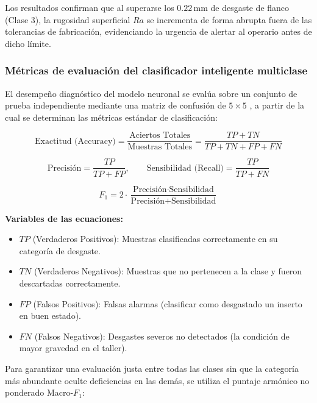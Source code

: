 Los resultados confirman que al superarse los $0.22\,\text{mm}$ de desgaste de flanco (Clase 3), la rugosidad superficial $Ra$ se incrementa de forma abrupta fuera de las tolerancias de fabricación, evidenciando la urgencia de alertar al operario antes de dicho límite.

\subsubsection{Métricas de evaluación del clasificador inteligente multiclase}

El desempeño diagnóstico del modelo neuronal se evalúa sobre un conjunto de prueba independiente mediante una matriz de confusión de $5 \times 5$ \citep{huang2026}, a partir de la cual se determinan las métricas estándar de clasificación:

\begin{equation}
\text{Exactitud (Accuracy)} = \frac{\text{Aciertos Totales}}{\text{Muestras Totales}} = \frac{TP + TN}{TP + TN + FP + FN}
\label{eq:exactitud}
\end{equation}

\begin{equation}
\text{Precisión} = \frac{TP}{TP + FP}, \qquad \text{Sensibilidad (Recall)} = \frac{TP}{TP + FN}
\label{eq:precision_recall}
\end{equation}

\begin{equation}
F_1 = 2 \cdot \frac{\text{Precisión} \cdot \text{Sensibilidad}}{\text{Precisión} + \text{Sensibilidad}}
\label{eq:f1_score}
\end{equation}

\noindent\textbf{Variables de las ecuaciones:}
\begin{itemize}
    \item $TP$ (Verdaderos Positivos): Muestras clasificadas correctamente en su categoría de desgaste.
    \item $TN$ (Verdaderos Negativos): Muestras que no pertenecen a la clase y fueron descartadas correctamente.
    \item $FP$ (Falsos Positivos): Falsas alarmas (clasificar como desgastado un inserto en buen estado).
    \item $FN$ (Falsos Negativos): Desgastes severos no detectados (la condición de mayor gravedad en el taller).
\end{itemize}

Para garantizar una evaluación justa entre todas las clases sin que la categoría más abundante oculte deficiencias en las demás, se utiliza el puntaje armónico no ponderado Macro-$F_1$:

